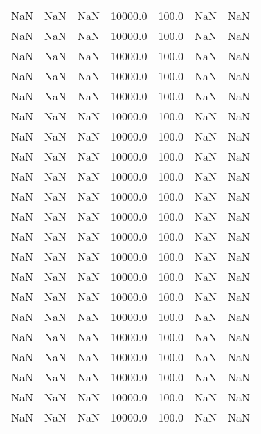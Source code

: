 \begin{tabular}{rrrrrrr}
     NaN &         NaN &         NaN & 10000.0 & 100.0 &          NaN &      NaN \\
     NaN &         NaN &         NaN & 10000.0 & 100.0 &          NaN &      NaN \\
     NaN &         NaN &         NaN & 10000.0 & 100.0 &          NaN &      NaN \\
     NaN &         NaN &         NaN & 10000.0 & 100.0 &          NaN &      NaN \\
     NaN &         NaN &         NaN & 10000.0 & 100.0 &          NaN &      NaN \\
     NaN &         NaN &         NaN & 10000.0 & 100.0 &          NaN &      NaN \\
     NaN &         NaN &         NaN & 10000.0 & 100.0 &          NaN &      NaN \\
     NaN &         NaN &         NaN & 10000.0 & 100.0 &          NaN &      NaN \\
     NaN &         NaN &         NaN & 10000.0 & 100.0 &          NaN &      NaN \\
     NaN &         NaN &         NaN & 10000.0 & 100.0 &          NaN &      NaN \\
     NaN &         NaN &         NaN & 10000.0 & 100.0 &          NaN &      NaN \\
     NaN &         NaN &         NaN & 10000.0 & 100.0 &          NaN &      NaN \\
     NaN &         NaN &         NaN & 10000.0 & 100.0 &          NaN &      NaN \\
     NaN &         NaN &         NaN & 10000.0 & 100.0 &          NaN &      NaN \\
     NaN &         NaN &         NaN & 10000.0 & 100.0 &          NaN &      NaN \\
     NaN &         NaN &         NaN & 10000.0 & 100.0 &          NaN &      NaN \\
     NaN &         NaN &         NaN & 10000.0 & 100.0 &          NaN &      NaN \\
     NaN &         NaN &         NaN & 10000.0 & 100.0 &          NaN &      NaN \\
     NaN &         NaN &         NaN & 10000.0 & 100.0 &          NaN &      NaN \\
     NaN &         NaN &         NaN & 10000.0 & 100.0 &          NaN &      NaN \\
     NaN &         NaN &         NaN & 10000.0 & 100.0 &          NaN &      NaN \\

\end{tabular}
